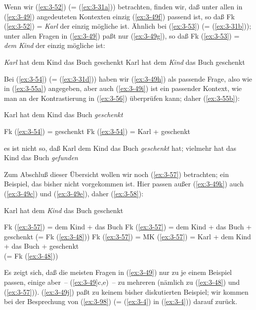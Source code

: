 \documentclass[output=paper]{langsci/langscibook}
\begin{document}
Wenn wir (\ref{ex:3-52}) (= (\ref{ex:3-31a})) betrachten, finden wir, daß unter allen in
(\ref{ex:3-49}) angedeuteten Kontexten einzig (\ref{ex:3-49f}) passend ist, so daß Fk (\ref{ex:3-52})
= \textit{Karl} der einzig mögliche  ist. Ähnlich bei (\ref{ex:3-53}) (= (\ref{ex:3-31b}));
unter allen Fragen in (\ref{ex:3-49}) paßt nur (\ref{ex:3-49g}), so daß Fk (\ref{ex:3-53}) = \textit{dem Kind}
der einzig mögliche  ist:
\begin{exe}
\ex \label{ex:3-52}
\textit{Karl} hat dem Kind das Buch geschenkt
\ex
\label{ex:3-53}
Karl hat dem \textit{Kind} das Buch geschenkt
\end{exe}
Bei (\ref{ex:3-54}) (= (\ref{ex:3-31d})) haben wir (\ref{ex:3-49h}) als passende Frage, also 
wie in (\ref{ex:3-55a}) angegeben, aber auch (\ref{ex:3-49i}) ist ein passender Kontext,
wie man an der Kontrastierung in (\ref{ex:3-56}) überprüfen kann; daher (\ref{ex:3-55b}):
\begin{exe}
\ex
\label{ex:3-54}
Karl hat dem Kind das Buch \emph{geschenkt}
\ex
\label{ex:3-55}
\begin{xlist}
\ex
\label{ex:3-55a}
Fk (\ref{ex:3-54}) = geschenkt
\ex
\label{ex:3-55b}
Fk (\ref{ex:3-54}) = Karl + geschenkt
\end{xlist}
\ex
\label{ex:3-56}
es ist nicht so, daß Karl dem Kind das Buch \textit{geschenkt} hat;
vielmehr hat das Kind das Buch \textit{gefunden}
\end{exe}
Zum Abschluß dieser Übersicht wollen wir noch (\ref{ex:3-57}) betrachten; ein
Beispiel, das bisher nicht vorgekommen ist. Hier passen außer (\ref{ex:3-49k})
auch (\ref{ex:3-49c}) und (\ref{ex:3-49e}), daher (\ref{ex:3-58}):
\begin{exe}
\ex
\label{ex:3-57}
Karl hat dem \textit{Kind} das Buch geschenkt
\ex
\label{ex:3-58}
\begin{xlist}
\ex
\label{ex:3-58a}
Fk (\ref{ex:3-57}) = dem Kind + das Buch
\ex
\label{ex:3-58b}
Fk (\ref{ex:3-57}) = dem Kind + das Buch + geschenkt (= Fk (\ref{ex:3-48}))
\ex
\label{ex:3-58c}
Fk (\ref{ex:3-57}) = MK (\ref{ex:3-57}) = Karl + dem Kind + das Buch + geschenkt\\
 (= Fk (\ref{ex:3-48}))
\end{xlist}
\end{exe}
Es zeigt sich, daß die meisten Fragen in (\ref{ex:3-49}) nur zu je einem Beispiel passen, einige aber~-- \zb (\ref{ex:3-49}c,e)~-- zu mehreren (nämlich zu
(\ref{ex:3-48}) und (\ref{ex:3-57})). (\ref{ex:3-49j}) paßt zu keinem bisher diskutierten Beispiel;
wir kommen bei der Besprechung von (\ref{ex:3-98}) (= (\ref{ex:3-4}) in (\ref{ex:3-4})) darauf zurück.
\end{document}

